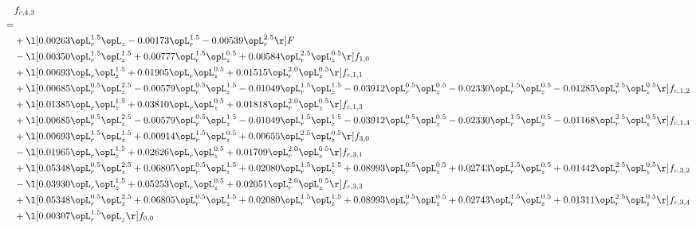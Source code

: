 \begin{alignat}{2} 
\label{eq:f_43_1} 
& f_{c,4,3} \nonumber \\ 
 = \\ 
& + \l[  0.00263 \opL_r^{1.5} \opL_z   -0.00173 \opL_r^{1.5}   -0.00539 \opL_r^{2.5}  \r] F \nonumber \\ 
& - \l[  0.00350 \opL_r^{1.5} \opL_z^{1.5} +  0.00777 \opL_r^{1.5} \opL_z^{0.5} +  0.00584 \opL_r^{2.5} \opL_z^{0.5}  \r] f_{1,0} \nonumber \\ 
& + \l[  0.00693 \opL_r \opL_z^{1.5} +  0.01905 \opL_r \opL_z^{0.5} +  0.01515 \opL_r^{2.0} \opL_z^{0.5}  \r] f_{c,1,1} \nonumber \\ 
& + \l[  0.00685 \opL_r^{0.5} \opL_z^{2.5}   -0.00579 \opL_r^{0.5} \opL_z^{1.5}   -0.01049 \opL_r^{1.5} \opL_z^{1.5}   -0.03912 \opL_r^{0.5} \opL_z^{0.5}   -0.02330 \opL_r^{1.5} \opL_z^{0.5}   -0.01285 \opL_r^{2.5} \opL_z^{0.5}  \r] f_{c,1,2} \nonumber \\ 
& + \l[  0.01385 \opL_r \opL_z^{1.5} +  0.03810 \opL_r \opL_z^{0.5} +  0.01818 \opL_r^{2.0} \opL_z^{0.5}  \r] f_{c,1,3} \nonumber \\ 
& + \l[  0.00685 \opL_r^{0.5} \opL_z^{2.5}   -0.00579 \opL_r^{0.5} \opL_z^{1.5}   -0.01049 \opL_r^{1.5} \opL_z^{1.5}   -0.03912 \opL_r^{0.5} \opL_z^{0.5}   -0.02330 \opL_r^{1.5} \opL_z^{0.5}   -0.01168 \opL_r^{2.5} \opL_z^{0.5}  \r] f_{c,1,4} \nonumber \\ 
& + \l[  0.00693 \opL_r^{1.5} \opL_z^{1.5} +  0.00914 \opL_r^{1.5} \opL_z^{0.5} +  0.00655 \opL_r^{2.5} \opL_z^{0.5}  \r] f_{3,0} \nonumber \\ 
& - \l[  0.01965 \opL_r \opL_z^{1.5} +  0.02626 \opL_r \opL_z^{0.5} +  0.01709 \opL_r^{2.0} \opL_z^{0.5}  \r] f_{c,3,1} \nonumber \\ 
& + \l[  0.05348 \opL_r^{0.5} \opL_z^{2.5} +  0.06805 \opL_r^{0.5} \opL_z^{1.5} +  0.02080 \opL_r^{1.5} \opL_z^{1.5} +  0.08993 \opL_r^{0.5} \opL_z^{0.5} +  0.02743 \opL_r^{1.5} \opL_z^{0.5} +  0.01442 \opL_r^{2.5} \opL_z^{0.5}  \r] f_{c,3,2} \nonumber \\ 
& - \l[  0.03930 \opL_r \opL_z^{1.5} +  0.05253 \opL_r \opL_z^{0.5} +  0.02051 \opL_r^{2.0} \opL_z^{0.5}  \r] f_{c,3,3} \nonumber \\ 
& + \l[  0.05348 \opL_r^{0.5} \opL_z^{2.5} +  0.06805 \opL_r^{0.5} \opL_z^{1.5} +  0.02080 \opL_r^{1.5} \opL_z^{1.5} +  0.08993 \opL_r^{0.5} \opL_z^{0.5} +  0.02743 \opL_r^{1.5} \opL_z^{0.5} +  0.01311 \opL_r^{2.5} \opL_z^{0.5}  \r] f_{c,3,4} \nonumber \\ 
& + \l[  0.00307 \opL_r^{1.5} \opL_z  \r] f_{0,0} \nonumber \\ 

\end{alignat}
